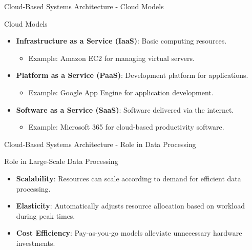 \documentclass[aspectratio=169]{beamer}
\begin{document}
\begin{frame}[fragile]{Cloud-Based Systems Architecture - Cloud Models}
    \begin{block}{Cloud Models}
        \begin{itemize}
            \item \textbf{Infrastructure as a Service (IaaS)}: Basic computing resources.
            \begin{itemize}
                \item Example: Amazon EC2 for managing virtual servers.
            \end{itemize}

            \item \textbf{Platform as a Service (PaaS)}: Development platform for applications.
            \begin{itemize}
                \item Example: Google App Engine for application development.
            \end{itemize}

            \item \textbf{Software as a Service (SaaS)}: Software delivered via the internet.
            \begin{itemize}
                \item Example: Microsoft 365 for cloud-based productivity software.
            \end{itemize}
        \end{itemize}
    \end{block}
\end{frame}

\begin{frame}[fragile]{Cloud-Based Systems Architecture - Role in Data Processing}
    \begin{block}{Role in Large-Scale Data Processing}
        \begin{itemize}
            \item \textbf{Scalability}: Resources can scale according to demand for efficient data processing.
            \item \textbf{Elasticity}: Automatically adjusts resource allocation based on workload during peak times.
            \item \textbf{Cost Efficiency}: Pay-as-you-go models alleviate unnecessary hardware investments.
        \end{itemize}
    \end{block}
\end{frame}
\end{document}
